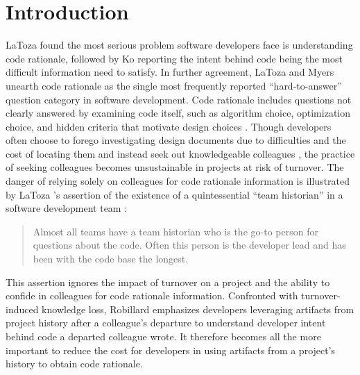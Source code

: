 
\chapter{Introduction}
\label{ch:Introduction}


LaToza \etal \cite{latoza_maintaining_2006} found the most serious problem software developers face is understanding code rationale, followed by Ko \etal \cite{ko_information_2007} reporting the intent behind code being the most difficult information need to satisfy. 
In further agreement, LaToza and Myers \cite{latoza_hard-answer_2010} unearth code rationale as the single most frequently reported “hard-to-answer” question category in software development. 
Code rationale includes questions not clearly answered by examining code itself, such as algorithm choice, optimization choice, and hidden criteria that motivate design choices \cite{latoza_hard-answer_2010}. 
Though developers often choose to forego investigating design documents due to difficulties and the cost of locating them and instead seek out knowledgeable colleagues \cite{latoza_maintaining_2006}, the practice of seeking colleagues becomes unsustainable in projects at risk of turnover. 
The danger of relying solely on colleagues for code rationale information is illustrated by LaToza \etal 's assertion of the existence of a quintessential ``team historian'' in a software development team \cite{latoza_maintaining_2006}:

\begin{quote}
Almost all teams have a team historian who is the go-to person for questions about the
code. Often this person is the developer lead and has been with the code base the longest.
\end{quote}

This assertion ignores the impact of turnover on a project and the ability to confide in colleagues for code rationale information.
Confronted with turnover-induced knowledge loss, Robillard \cite{robillard_turnover-induced_2021} emphasizes developers leveraging artifacts from project history after a colleague’s departure to understand developer intent behind code a departed colleague wrote. 
It therefore becomes all the more important to reduce the cost for developers in using artifacts from a project's history to obtain code rationale. 

